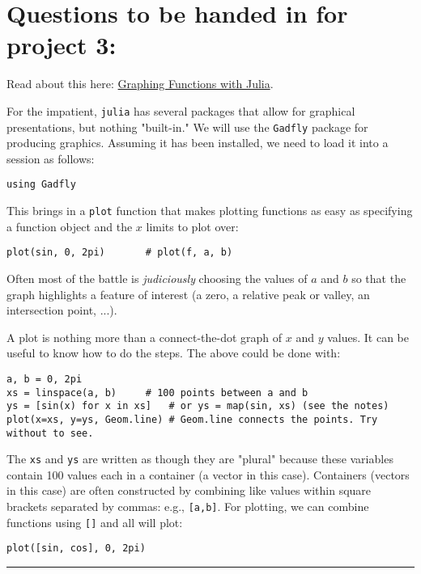 \documentclass[12pt]{article}
\begin{document}
\section{Questions to be handed in for project 3:}

Read about this here:
\href{http://mth229.github.io/graphing.html}{Graphing Functions with
Julia}.

For the impatient, \texttt{julia} has several packages that allow for
graphical presentations, but nothing "built-in." We will use the
\texttt{Gadfly} package for producing graphics. Assuming it has been
installed, we need to load it into a session as follows:



\begin{verbatim}
using Gadfly 
\end{verbatim}
This brings in a \texttt{plot} function that makes plotting functions as
easy as specifying a function object and the $x$ limits to plot over:



\begin{verbatim}
plot(sin, 0, 2pi)       # plot(f, a, b)
\end{verbatim}
Often most of the battle is \emph{judiciously} choosing the values of
$a$ and $b$ so that the graph highlights a feature of interest (a zero,
a relative peak or valley, an intersection point, ...).

A plot is nothing more than a connect-the-dot graph of $x$ and $y$
values. It can be useful to know how to do the steps. The above could be
done with:



\begin{verbatim}
a, b = 0, 2pi
xs = linspace(a, b)     # 100 points between a and b
ys = [sin(x) for x in xs]   # or ys = map(sin, xs) (see the notes)
plot(x=xs, y=ys, Geom.line) # Geom.line connects the points. Try without to see.
\end{verbatim}
The \texttt{xs} and \texttt{ys} are written as though they are "plural"
because these variables contain 100 values each in a container (a vector
in this case). Containers (vectors in this case) are often constructed
by combining like values within square brackets separated by commas:
e.g., \texttt{{[}a,b{]}}. For plotting, we can combine functions using
\texttt{{[}{]}} and all will plot:



\begin{verbatim}
plot([sin, cos], 0, 2pi)
\end{verbatim}
\begin{center}\rule{3in}{0.4pt}\end{center}
\end{document}
